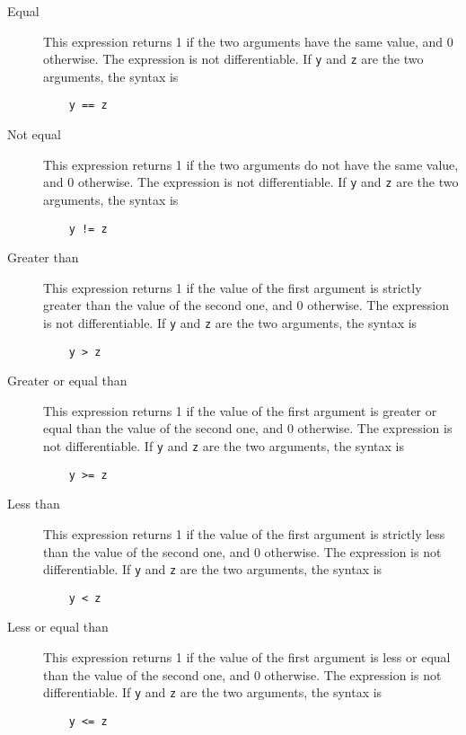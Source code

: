 \documentclass[12pt,a4paper]{article}
\begin{document}
\begin{description}
\item[Equal] This expression returns 1 if the two arguments have the same value, and 0 otherwise.
  The expression is not differentiable. If \lstinline+y+ and \lstinline+z+ are the two arguments,  the syntax is
  \begin{lstlisting}
    y == z
  \end{lstlisting}

\item[Not equal] This expression returns 1 if the two arguments do not have the same value, and 0 otherwise.
  The expression is not differentiable. If \lstinline+y+ and \lstinline+z+ are the two arguments,  the syntax is
  \begin{lstlisting}
    y != z
  \end{lstlisting}

\item[Greater than] This expression returns 1 if the value of the first argument is strictly greater than the value of the second one, and 0 otherwise.
  The expression is not differentiable. If \lstinline+y+ and \lstinline+z+ are the two arguments,  the syntax is
  \begin{lstlisting}
    y > z
  \end{lstlisting}

\item[Greater or equal than] This expression returns 1 if the value of the first argument is greater or equal than the value of the second one, and 0 otherwise.
  The expression is not differentiable. If \lstinline+y+ and \lstinline+z+ are the two arguments,  the syntax is
  \begin{lstlisting}
    y >= z
  \end{lstlisting}

\item[Less than] This expression returns 1 if the value of the first argument is strictly less than the value of the second one, and 0 otherwise.
  The expression is not differentiable. If \lstinline+y+ and \lstinline+z+ are the two arguments,  the syntax is
  \begin{lstlisting}
    y < z
  \end{lstlisting}

\item[Less or equal than] This expression returns 1 if the value of the first argument is less or equal than the value of the second one, and 0 otherwise.
  The expression is not differentiable. If \lstinline+y+ and \lstinline+z+ are the two arguments,  the syntax is
  \begin{lstlisting}
    y <= z
  \end{lstlisting}
\end{description}
\end{document}
